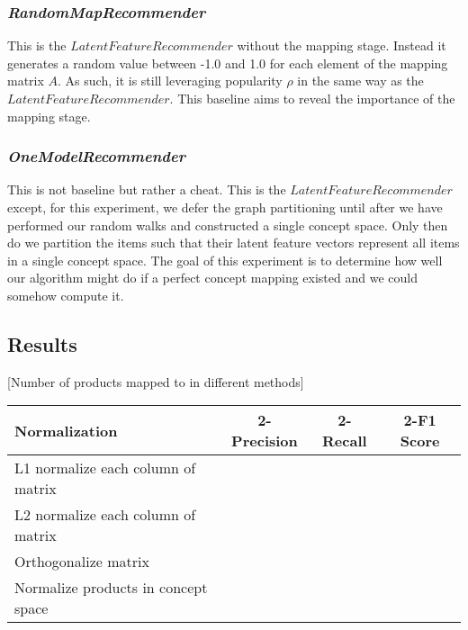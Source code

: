 \documentclass[11pt]{article}
\begin{document}
\subsubsection*{\em RandomMapRecommender}
This is the $LatentFeatureRecommender$ without the mapping stage. Instead it
generates a random value between -1.0 and 1.0 for each element of the mapping
matrix $A$. As such, it is still leveraging popularity $\rho$ in the same way as
the $LatentFeatureRecommender$. This baseline aims to reveal the importance of
the mapping stage.

\subsubsection*{\em OneModelRecommender}
This is not baseline but rather a cheat. This is the $LatentFeatureRecommender$
except, for this experiment, we defer the graph partitioning until after we have
performed our random walks and constructed a single concept space. Only then do
we partition the items such that their latent feature vectors represent all
items in a single concept space. The goal of this experiment is to determine how
well our algorithm might do if a perfect concept mapping existed and we could
somehow compute it.


\subsection*{Results}
[Number of products mapped to in different methods]
\begin{center}
\begin{tabular}{ | l | c | c | c |}
\hline
Normalization & 2-Precision & 2-Recall & 2-F1 Score \\ \hline\hline
L1 normalize each column of matrix &&&\\ \hline
L2 normalize each column of matrix &&&\\ \hline
Orthogonalize matrix &&&\\ \hline
Normalize products in concept space &&&\\ \hline
\end{tabular}
\end{center}
\end{document}
